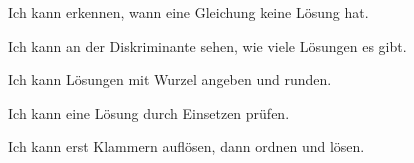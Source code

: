 \documentclass[11pt]{article}
\begin{document}
\begin{kbaufgabe}{Ich kann erkennen, wann eine Gleichung keine Lösung hat.}
\begin{kbblock}
\end{kbblock}
\end{kbaufgabe}

\begin{kbaufgabe}{Ich kann an der Diskriminante sehen, wie viele Lösungen es gibt.}
\begin{kbblock}
\end{kbblock}
\end{kbaufgabe}

\begin{kbaufgabe}{Ich kann Lösungen mit Wurzel angeben und runden.}
\begin{kbblock}
\end{kbblock}
\end{kbaufgabe}

\begin{kbaufgabe}{Ich kann eine Lösung durch Einsetzen prüfen.}
\begin{kbblock}
\end{kbblock}
\end{kbaufgabe}

\begin{kbaufgabe}{Ich kann erst Klammern auflösen, dann ordnen und lösen.}
\begin{kbblock}
\end{kbblock}
\end{kbaufgabe}
\end{document}
